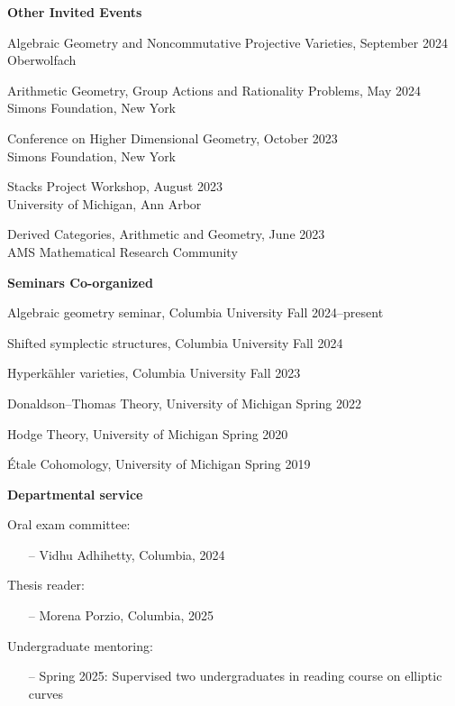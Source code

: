\documentclass[11 pt]{letter}
\begin{document}
	\medskip
	\noindent
	\textbf{Other Invited Events}

	Algebraic Geometry and Noncommutative Projective Varieties, \hfill September 2024 \\
	\indent Oberwolfach

	Arithmetic Geometry, Group Actions and Rationality Problems, \hfill May 2024 \\
	\indent Simons Foundation, New York

	Conference on Higher Dimensional Geometry, \hfill October 2023 \\
	\indent Simons Foundation, New York

	Stacks Project Workshop, \hfill August 2023 \\
	\indent University of Michigan, Ann Arbor 

	Derived Categories, Arithmetic and Geometry, \hfill June 2023 \\
	\indent AMS Mathematical Research Community 


	
	\medskip
	\noindent
	\textbf{\large{Seminars Co-organized}}

	Algebraic geometry seminar, Columbia University \hfill Fall 2024--present

	Shifted symplectic structures, Columbia University \hfill Fall 2024

	Hyperk\"ahler varieties, Columbia University \hfill Fall 2023

	Donaldson--Thomas Theory, University of Michigan \hfill Spring 2022

	Hodge Theory, University of Michigan \hfill Spring 2020

	\'Etale Cohomology, University of Michigan \hfill Spring 2019 

	

	\medskip
	\noindent
	\textbf{Departmental service}

	\noindent
	Oral exam committee: 
	\begin{itemize}
		\item[--] Vidhu Adhihetty, Columbia, 2024
	\end{itemize}

	\noindent
	Thesis reader: 
	\begin{itemize}
		\item[--] Morena Porzio, Columbia, 2025
	\end{itemize}

	\noindent
	Undergraduate mentoring:
	\begin{itemize}
		\item[--] Spring 2025: Supervised two undergraduates in reading course on elliptic curves
	\end{itemize}
\end{document}

